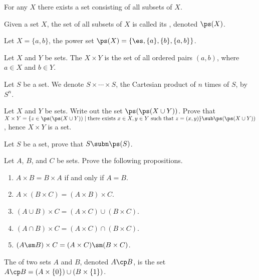 \documentclass[10pt]{article}
\begin{document}
\begin{Axiom of power set}
    For any $X$ there exists a set consisting of all subsets of $X$.
\end{Axiom of power set}
\begin{definition}
    Given a set $X$, the set of all subsets of $X$ is called its , denoted $\ps(X)$.
\end{definition}
\begin{example}
    Let $X=\{a,b\}$, the power set $\ps(X)=\{\es,\{a\},\{b\},\{a,b\}\}$.
\end{example}
\begin{definition}
    Let $X$ and $Y$ be sets. The  $X\times Y$ is the set of all ordered pairs $(a,b)$, where $a\in X$ and $b\in Y$.
\end{definition}
\begin{remark}
    Let $S$ be a set. We denote $S\times\cdots\times S$, the Cartesian product of $n$ times of $S$, by ${S}^{n}$.
\end{remark}
\begin{problem}
    Let $X$ and $Y$ be sets. Write out the set $\ps(\ps(X\cup Y))$. Prove that $X\times Y=\{z\in\ps(\ps(X\cup Y))\mid\text{there exists}\ x\in X,y\in Y\ \text{such that}\ z=(x,y)\}\sub\ps(\ps(X\cup Y))$, hence $X\times Y$ is a set.
\end{problem}
\begin{problem}
    Let $S$ be a set, prove that $S\subn\ps(S)$. 
\end{problem}
\begin{problem}
    Let $A$, $B$, and $C$ be sets. Prove the following propositions.
    \begin{enumerate}
        \item $A\times B=B\times A$ if and only if $A=B$.
        \item $A\times(B\times C)=(A\times B)\times C$.
        \item $(A\cup B)\times C=(A\times C)\cup(B\times C)$.
        \item $(A\cap B)\times C=(A\times C)\cap(B\times C)$.
        \item $(A\sm B)\times C=(A\times C)\sm(B\times C)$.
    \end{enumerate}
\end{problem}
\begin{definition}
    The  of two sets $A$ and $B$, denoted $A\cp B$, is the set $A\cp B=(A\times\{0\})\cup(B\times\{1\})$.
\end{definition}
\end{document}
